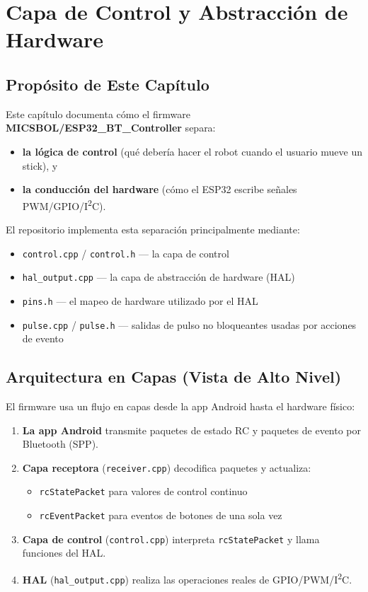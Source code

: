 \chapter{Capa de Control y Abstracción de Hardware}
\label{ch:control-hal}

\section{Propósito de Este Capítulo}
\label{sec:control-hal-purpose}

Este capítulo documenta cómo el firmware \textbf{MICSBOL/ESP32\_BT\_Controller} separa:

\begin{itemize}
    \item \textbf{la lógica de control} (qué debería hacer el robot cuando el usuario mueve un stick), y
    \item \textbf{la conducción del hardware} (cómo el ESP32 escribe señales PWM/GPIO/I\textsuperscript{2}C).
\end{itemize}

El repositorio implementa esta separación principalmente mediante:

\begin{itemize}
    \item \texttt{control.cpp} / \texttt{control.h} --- la capa de control
    \item \texttt{hal\_output.cpp} --- la capa de abstracción de hardware (HAL)
    \item \texttt{pins.h} --- el mapeo de hardware utilizado por el HAL
    \item \texttt{pulse.cpp} / \texttt{pulse.h} --- salidas de pulso no bloqueantes usadas por acciones de evento
\end{itemize}

\section{Arquitectura en Capas (Vista de Alto Nivel)}
\label{sec:control-hal-architecture}

El firmware usa un flujo en capas desde la app Android hasta el hardware físico:

\begin{enumerate}
    \item \textbf{La app Android} transmite paquetes de estado RC y paquetes de evento por Bluetooth (SPP).
    \item \textbf{Capa receptora} (\texttt{receiver.cpp}) decodifica paquetes y actualiza:
    \begin{itemize}
        \item \texttt{rcStatePacket} para valores de control continuo
        \item \texttt{rcEventPacket} para eventos de botones de una sola vez
    \end{itemize}
    \item \textbf{Capa de control} (\texttt{control.cpp}) interpreta \texttt{rcStatePacket} y llama funciones del HAL.
    \item \textbf{HAL} (\texttt{hal\_output.cpp}) realiza las operaciones reales de GPIO/PWM/I\textsuperscript{2}C.
\end{enumerate}


